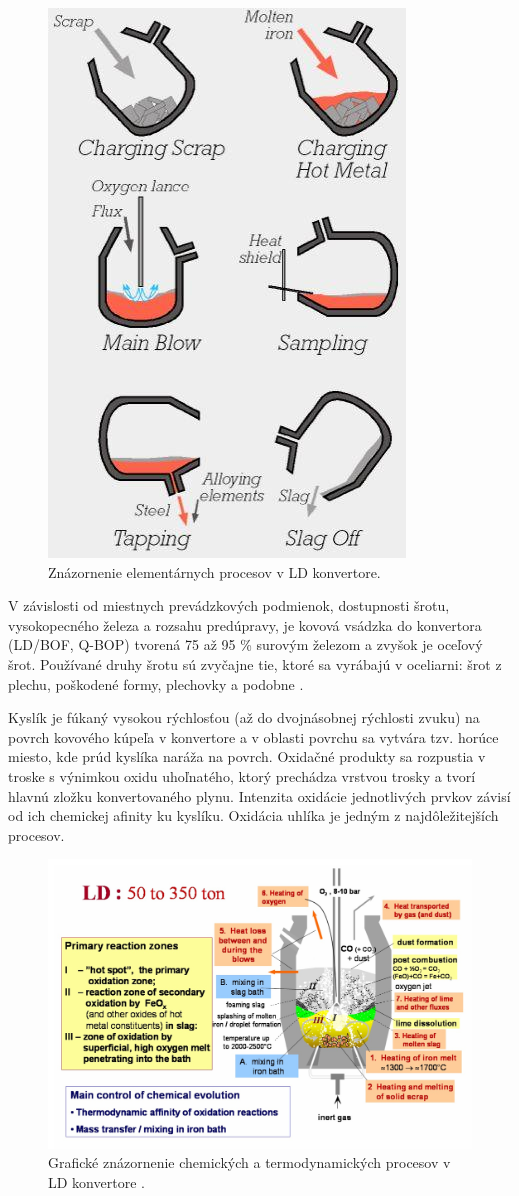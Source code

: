 \documentclass[]{tukediphc}
\begin{document}
\begin{figure}[h!]
	\centering
	\includegraphics[width=.4\textwidth,angle=0]{convertor-phases.jpg}
	\caption{Znázornenie elementárnych procesov v LD konvertore.}
	\label{o:30}
\end{figure}

V závislosti od miestnych prevádzkových podmienok, dostupnosti šrotu, vysokopecného železa a rozsahu predúpravy, je kovová vsádzka do konvertora (LD/BOF, Q-BOP) tvorená 75 až 95 \% surovým železom a zvyšok je oceľový šrot. Používané druhy šrotu sú zvyčajne tie, ktoré sa vyrábajú v oceliarni: šrot z plechu, poškodené formy, plechovky a podobne \cite{Turkdogan1996}.

Kyslík je fúkaný vysokou rýchlosťou (až do dvojnásobnej rýchlosti zvuku) na povrch kovového kúpeľa v konvertore a v oblasti povrchu sa vytvára tzv. horúce miesto, kde prúd kyslíka naráža na povrch. Oxidačné produkty sa rozpustia v troske s výnimkou oxidu uhoľnatého, ktorý prechádza vrstvou trosky a tvorí hlavnú zložku konvertovaného plynu. Intenzita oxidácie jednotlivých prvkov závisí od ich chemickej afinity ku kyslíku. Oxidácia uhlíka je jedným z najdôležitejších procesov.

\begin{figure}[h!]
	\centering
	\includegraphics[width=1\textwidth,angle=0]{figures/ld-convertor-processes-graphical.jpg}
	\caption{Grafické znázornenie chemických a termodynamických procesov v LD konvertore \citep{Jalkanen2006}.}
\end{figure}
\end{document}
